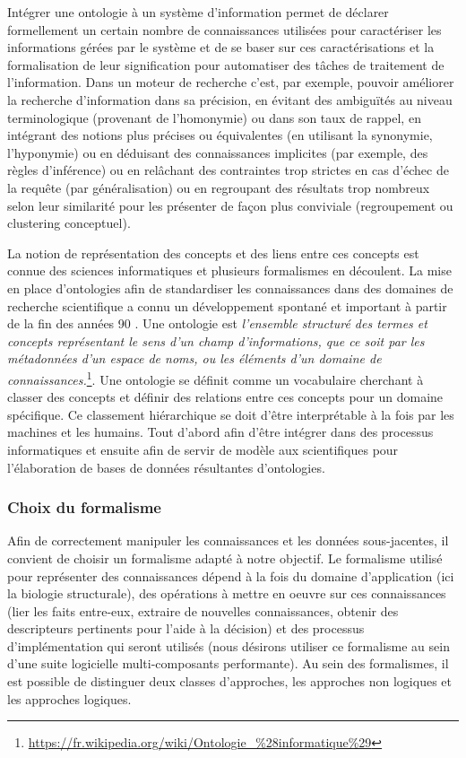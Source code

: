 Intégrer une ontologie à un système d'information permet de déclarer formellement un certain nombre de connaissances utilisées pour caractériser les informations gérées par le système et de se baser sur ces caractérisations et la formalisation de leur signification pour automatiser des tâches de traitement de l'information.
Dans un moteur de recherche c'est, par exemple, pouvoir améliorer la recherche d'information dans sa précision, en évitant des ambiguïtés au niveau terminologique (provenant de l'homonymie) ou dans son taux de rappel, en intégrant des notions plus précises ou équivalentes (en utilisant la synonymie, l'hyponymie) ou en déduisant des connaissances implicites (par exemple, des règles d'inférence) ou en relâchant des contraintes trop strictes en cas d'échec de la requête (par généralisation) ou en regroupant des résultats trop nombreux selon leur similarité pour les présenter de façon plus conviviale (regroupement ou clustering conceptuel).

La notion de représentation des concepts et des liens entre ces concepts est connue des sciences informatiques et plusieurs formalismes en découlent. La mise en place d'ontologies afin de standardiser les connaissances dans des domaines de recherche scientifique a connu un développement spontané et important à partir de la fin des années 90 \cite{schulze-kremer_ontologies_2002, baker_ontology_1999}. 
Une ontologie est \textit{l'ensemble structuré des termes et concepts représentant le sens d'un champ d'informations, que ce soit par les métadonnées d'un espace de noms, ou les éléments d'un domaine de connaissances.}\footnote{\url{https://fr.wikipedia.org/wiki/Ontologie_\%28informatique\%29}}. Une ontologie se définit comme un vocabulaire cherchant à classer des concepts et définir des relations entre ces concepts pour un domaine spécifique. Ce classement hiérarchique se doit d'être interprétable à la fois par les machines et les humains. Tout d'abord afin d'être intégrer dans des processus informatiques et ensuite afin de servir de modèle aux scientifiques pour l'élaboration de bases de données résultantes d'ontologies.


\subsubsection{Choix du formalisme}

Afin de correctement manipuler les connaissances et les données sous-jacentes, il convient de choisir un formalisme adapté à notre objectif. Le formalisme utilisé pour représenter des connaissances dépend à la fois du domaine d'application (ici la biologie structurale), des opérations à mettre en oeuvre sur ces connaissances (lier les faits entre-eux, extraire de nouvelles connaissances, obtenir des descripteurs pertinents pour l'aide à la décision) et des processus d'implémentation qui seront utilisés (nous désirons utiliser ce formalisme au sein d'une suite logicielle multi-composants performante). Au sein des formalismes, il est possible de distinguer deux classes d'approches, les approches non logiques et les approches logiques.

